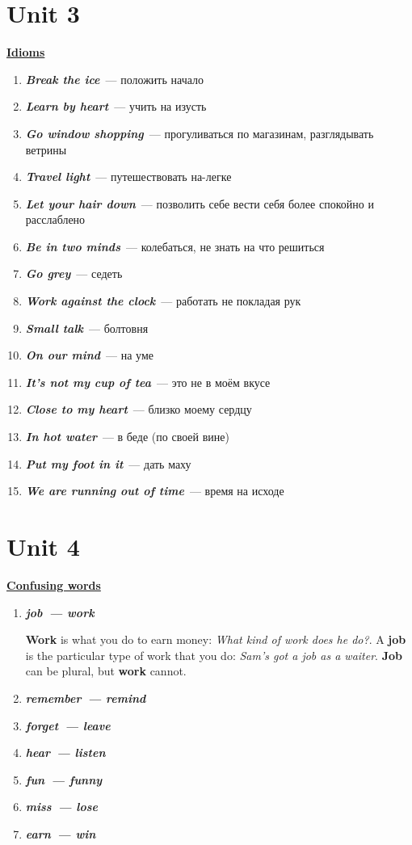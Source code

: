 \documentclass[10pt,a4paper]{article}
\newcommand\ex[1]{\textit{\textbf{{#1}}}}
\begin{document}
\section{Unit 3}
\textbf{\underline{Idioms}}

\begin{enumerate}
  \item \ex{Break the ice}~--- положить начало 
  \item \ex{Learn by heart}~--- учить на изусть
  \item \ex{Go window shopping}~--- прогуливаться по магазинам, разглядывать ветрины
  \item \ex{Travel light}~--- путешествовать на-легке
  \item \ex{Let your hair down}~--- позволить себе вести себя более спокойно и расслаблено
  \item \ex{Be in two minds}~--- колебаться, не знать на что решиться
  \item \ex{Go grey}~--- седеть
  \item \ex{Work against the clock}~--- работать не покладая рук
  \item \ex{Small talk}~--- болтовня
  \item \ex{On our mind}~--- на уме
  \item \ex{It's not my cup of tea}~--- это не в моём вкусе
  \item \ex{Close to my heart}~--- близко моему сердцу
  \item \ex{In hot water}~--- в беде (по своей вине)
  \item \ex{Put my foot in it}~--- дать маху
  \item \ex{We are running out of time}~--- время на исходе
\end{enumerate}

 
 


\section{Unit 4}

\textbf{\underline{Confusing words}}
\begin{enumerate}
  \item \ex{job~--- work}
  
  \textbf{Work} is what you do to earn money: \textit{What kind of work does he do?}. A \textbf{job} is the particular type of work that you do: \textit{Sam's got a job as a waiter}. \textbf{Job} can be plural, but \textbf{work} cannot.
  \item \ex{remember~--- remind}
  \item \ex{forget~--- leave}
  \item \ex{hear~--- listen}
  \item \ex{fun~--- funny}
  \item \ex{miss~--- lose}
  \item \ex{earn~--- win}
\end{enumerate}
\end{document}
